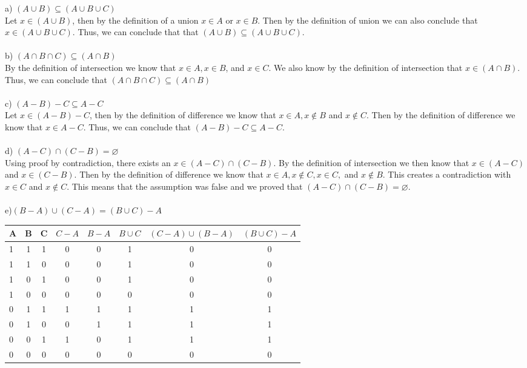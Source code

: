 \documentclass[11pt, oneside]{article}   	%
\begin{document}
a) $(A\cup B)\subseteq(A\cup B\cup C)$\\
Let $x\in (A\cup B)$, then by the definition of a union $x\in A$ or $x\in B$. Then by the definition of union we can also conclude that $x\in(A\cup B\cup C)$. Thus, we can conclude that that $(A\cup B)\subseteq(A\cup B\cup C)$.\\\\
b) $(A\cap B\cap C)\subseteq (A\cap B)$\\
By the definition of intersection we know that $x\in A, x\in B$, and $x\in C$. We also know by the definition of intersection that $x\in (A\cap B)$. Thus, we can conclude that $(A\cap B\cap C)\subseteq (A\cap B)$\\\\
c) $(A - B) - C\subseteq A - C$\\
Let $x\in(A - B) - C$, then by the definition of difference we know that $x\in A, x\notin B$ and $x\notin C$. Then by the definition of difference we know that $x\in A - C$. Thus, we can conclude that $(A - B) - C\subseteq A - C$.\\\\
d) $(A - C)\cap (C - B) = \varnothing$\\
Using proof by contradiction, there exists an $x\in(A - C)\cap (C - B)$. By the definition of intersection we then know that $x\in(A - C)$ and $x\in(C - B)$. Then by the definition of difference we know that $x\in A, x\notin C, x\in C,$ and $x\notin B$. This creates a contradiction with $x\in C$ and $x\notin C$. This means that the assumption was false and we proved that $(A - C)\cap (C - B) = \varnothing$.\\\\ 
e)$(B - A)\cup (C - A) = (B\cup C) - A$\\
\begin{tabular} {| l | c | c | c | c | c | c || c |}
  \hline
  A & B & C & $C - A$ & $B - A$ & $B\cup C$ & $(C - A)\cup(B - A)$ & $(B\cup C) - A$ \\ \hline
  1 & 1 & 1 & 0 & 0 & 1 & 0 & 0 \\ \hline
  1 & 1 & 0 & 0 & 0 & 1 & 0 & 0\\ \hline
  1 & 0 & 1 & 0 & 0 & 1 & 0 & 0 \\ \hline
  1 & 0 & 0 & 0 & 0 & 0 & 0 & 0 \\ \hline
  0 & 1 & 1 & 1 & 1 & 1 & 1 & 1 \\ \hline
  0 & 1 & 0 & 0 & 1 & 1 & 1 & 1 \\ \hline
  0 & 0 & 1 & 1 & 0 & 1 & 1 & 1 \\ \hline
  0 & 0 & 0 & 0 & 0 & 0 & 0 & 0  \\ \hline
\end{tabular}\\\\\\
\end{document}

